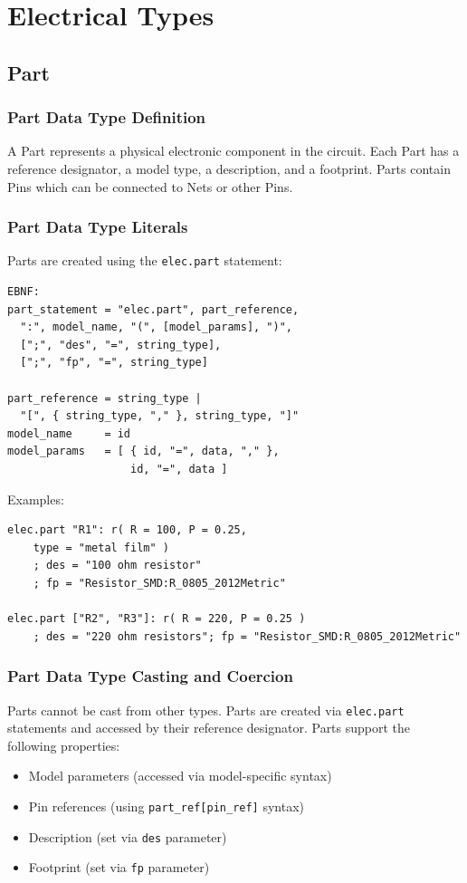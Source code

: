 \section{Electrical Types}
\subsection{Part}
\subsubsection{Part Data Type Definition}
A Part represents a physical electronic component in the circuit. Each Part has a reference designator, a model type, a description, and a footprint. Parts contain Pins which can be connected to Nets or other Pins.
\subsubsection{Part Data Type Literals}
Parts are created using the \texttt{elec.part} statement:
\begin{verbatim}
EBNF:
part_statement = "elec.part", part_reference, 
  ":", model_name, "(", [model_params], ")",
  [";", "des", "=", string_type], 
  [";", "fp", "=", string_type]

part_reference = string_type | 
  "[", { string_type, "," }, string_type, "]"
model_name     = id
model_params   = [ { id, "=", data, "," }, 
                   id, "=", data ]
\end{verbatim}
Examples:
\begin{verbatim}
elec.part "R1": r( R = 100, P = 0.25, 
    type = "metal film" )
    ; des = "100 ohm resistor"
    ; fp = "Resistor_SMD:R_0805_2012Metric"

elec.part ["R2", "R3"]: r( R = 220, P = 0.25 )
    ; des = "220 ohm resistors"; fp = "Resistor_SMD:R_0805_2012Metric"
\end{verbatim}
\subsubsection{Part Data Type Casting and Coercion}
Parts cannot be cast from other types. Parts are created via \texttt{elec.part} statements and accessed by their reference designator. Parts support the following properties:
\begin{itemize}
\item Model parameters (accessed via model-specific syntax)
\item Pin references (using \texttt{part\_ref[pin\_ref]} syntax)
\item Description (set via \texttt{des} parameter)
\item Footprint (set via \texttt{fp} parameter)
\end{itemize}
